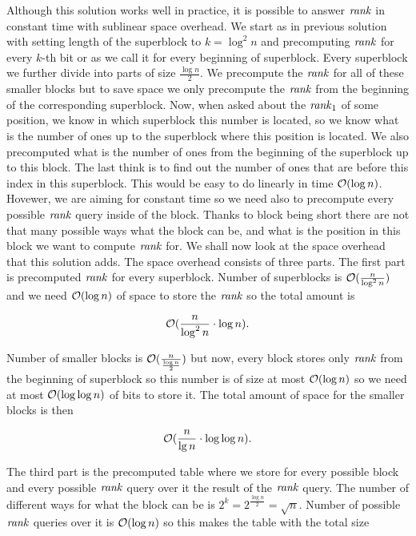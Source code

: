 Although this solution works well in practice, it is possible to answer $\mathit{rank}$ in constant time
with sublinear space overhead. We start as in previous solution with setting length of the
superblock to $k=\log^2 n$ and precomputing $\mathit{rank}$ for every $k$-th bit or as we call it for
every beginning of superblock. Every superblock we further divide into parts of size $\frac{\log n}{2}$.
We precompute the $\mathit{rank}$ for all of these smaller blocks but to save space we only precompute the
$\mathit{rank}$ from the beginning of the corresponding superblock. Now, when asked about the $\mathit{rank}_1$ of
some position, we know in which superblock this number is located, so we know what is the number
of ones up to the superblock where this position is located. We also precomputed what is the
number of ones from the beginning of the superblock up to this block. The last think is to
find out the number of ones that are before this index in this superblock. This would be easy
to do linearly in time $\mathcal{O}(\log n)$. Hovewer, we are aiming for constant time so we need
also to precompute every possible $\mathit{rank}$ query inside of the block. Thanks to block being short
there are not that many possible ways what the block can be, and what is the position in this
block we want to compute $\mathit{rank}$ for. We shall now look at the space overhead that this solution
adds. The space overhead consists of three parts. The first part is precomputed $\mathit{rank}$ for
every superblock. Number of superblocks is $\mathcal{O}(\frac{n}{\log^2 n})$ and we need
$\mathcal{O}(\log n)$ of space to store the $\mathit{rank}$ so the total amount is

\begin{equation}
    \mathcal{O}(\frac{n}{\log^2 n}\cdot \log n).
    \label{eq:rank_space_1}
\end{equation}

Number of smaller blocks is $\mathcal{O}(\frac{n}{\frac{\log n}{2}})$ but now, every block stores only $\mathit{rank}$
from the beginning of superblock so this number is of size at most $\mathcal{O}(\log n)$ so we need
at most $\mathcal{O}(\log\log n)$ of bits to store it. The total amount of space for the smaller
blocks is then

\begin{equation}
    \mathcal{O}(\frac{n}{\lg n}\cdot \log\log n).
    \label{eq:rank_space_2}
\end{equation}

The third part is the precomputed table where we store for every possible block and every
possible $\mathit{rank}$ query over it the result of the $\mathit{rank}$ query. The number of different ways for
what the block can be is $2^{k} = 2^{\frac{\log n}{2}} = \sqrt{n}$. Number of possible $\mathit{rank}$ queries
over it is $\mathcal{O}(\log n)$ so this makes the table with the total size 

